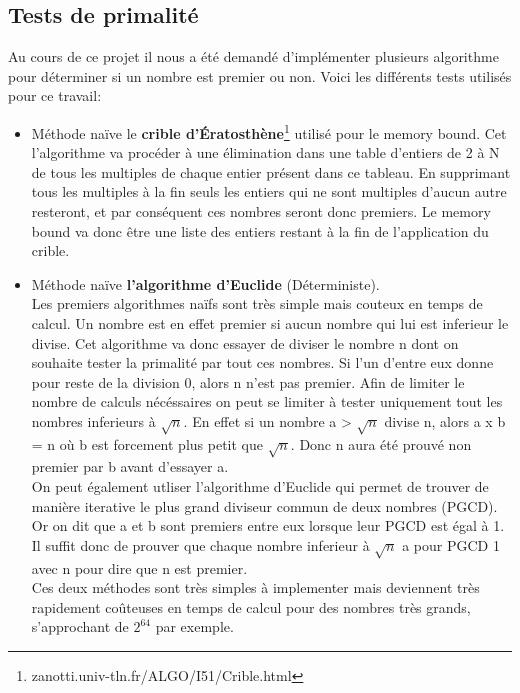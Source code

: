 		\subsection{Tests de primalité}
		Au cours de ce projet il nous a été demandé d'implémenter plusieurs algorithme pour déterminer si un nombre est premier ou non. Voici les différents tests utilisés pour ce travail:
		\begin{itemize}
			\item Méthode naïve le \textbf{crible d’Ératosthène}\footnote{zanotti.univ-tln.fr/ALGO/I51/Crible.html} utilisé pour le memory bound. Cet l'algorithme va procéder à une élimination dans une table d'entiers de 2 à N de tous les multiples de chaque entier présent dans ce tableau. En supprimant tous les multiples à la fin seuls les entiers qui ne sont multiples d'aucun autre resteront, et par conséquent ces nombres seront donc premiers. Le memory bound va donc être une liste des entiers restant à la fin de l'application du crible.\\
			
			\item Méthode naïve \textbf{l'algorithme d'Euclide} (Déterministe).\\ Les premiers algorithmes naïfs sont très simple mais couteux en temps de calcul. Un nombre est en effet premier si aucun nombre qui lui est inferieur le divise. Cet algorithme va donc essayer de diviser le nombre n dont on souhaite tester la primalité par tout ces nombres. Si l'un d'entre eux donne pour reste de la division 0, alors n n'est pas premier. Afin de limiter le nombre de calculs nécéssaires on peut se limiter à tester uniquement tout les nombres inferieurs à $\sqrt{n}$. En effet si un nombre a > $\sqrt{n}$ divise n, alors a x b = n où b est forcement plus petit que $\sqrt{n}$. Donc n aura été prouvé non premier par b avant d'essayer a.\\
On peut également utliser l'algorithme d'Euclide qui permet de trouver de manière iterative le plus grand diviseur commun de deux nombres (PGCD). Or on dit que a et b sont premiers entre eux lorsque leur PGCD est égal à 1. Il suffit donc de prouver que chaque nombre inferieur à $\sqrt{n}$ a pour PGCD 1 avec n pour dire que n est premier.
\\
Ces deux méthodes sont très simples à implementer mais deviennent très rapidement coûteuses en temps de calcul pour des nombres très grands, s'approchant de $2^{64}$ par exemple.\\
			

\end{itemize}
